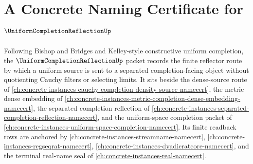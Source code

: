 \chapter{A Concrete Naming Certificate for $\UniformCompletionReflectionUp$}
\label{ch:concrete-instances-uniform-completion-reflection-namecert}

Following Bishop and Bridges and Kelley-style constructive uniform completion, the $\UniformCompletionReflectionUp$ packet records the finite reflector route by which a uniform source is sent to a separated completion-facing object without quotienting Cauchy filters or selecting limits. It sits beside the dense-source route of \autoref{ch:concrete-instances-cauchy-completion-density-source-namecert}, the metric dense embedding of \autoref{ch:concrete-instances-metric-completion-dense-embedding-namecert}, the separated completion reflection of \autoref{ch:concrete-instances-separated-completion-reflection-namecert}, and the uniform-space completion packet of \autoref{ch:concrete-instances-uniform-space-completion-namecert}. Its finite readback rows are anchored by \autoref{ch:concrete-instances-streamname-namecert}, \autoref{ch:concrete-instances-regseqrat-namecert}, \autoref{ch:concrete-instances-dyadicratcore-namecert}, and the terminal real-name seal of \autoref{ch:concrete-instances-real-namecert}.

